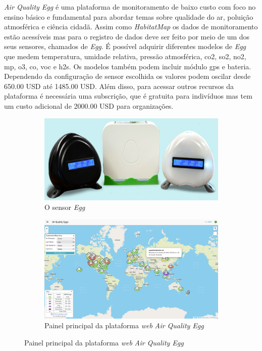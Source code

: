 \textit{Air Quality Egg} é uma plataforma de monitoramento de baixo custo com foco no ensino básico e fundamental para abordar temas sobre qualidade do ar, poluição atmosférica e ciência cidadã. Assim como \textit{HabitatMap} os dados de monitoramento estão acessíveis mas para o registro de dados deve ser feito por meio de um dos seus sensores, chamados de \textit{Egg}. É possível adquirir diferentes modelos de \textit{Egg} que medem temperatura, umidade relativa, pressão atmosférica, \acrshort{co2}, \acrshort{so2}, \acrshort{no2}, \acrshort{mp}, \acrshort{o3}, \acrshort{co}, \acrshort{voc} e \acrshort{h2s}. Os modelos também podem incluir módulo \acrshort{gps} e bateria. Dependendo da configuração de sensor escolhida os valores podem oscilar desde 650.00 USD até 1485.00 USD. Além disso, para acessar outros recursos da plataforma é necessária uma subscrição, que é gratuita para indivíduos mas tem um custo adicional de 2000.00 USD para organizações.

\begin{figure}[h]
    \centering
    \caption{O portal \textit{Air Quality Egg} e o sensor \textit{Egg}}
    \begin{subfigure}{0.49\textwidth}
        \includegraphics[width=\textwidth]{chapters/1-MONITORAMENTO/Figuras/Air Quality Egg.jpg}
        \caption{O sensor \textit{Egg}}
        \label{fig:air-quality-egg}
    \end{subfigure}
    \hfill
    \begin{subfigure}{0.49\textwidth}
        \includegraphics[width=\textwidth]{chapters/1-MONITORAMENTO/Figuras/Air Quality Egg Portal.png}
        \caption{Painel principal da plataforma \textit{web} \textit{Air Quality Egg}}
        \label{fig:air-quality-egg-portal}
    \end{subfigure}
    \hfill
    \label{fig:air-quality-egg-initiative}
\end{figure}

